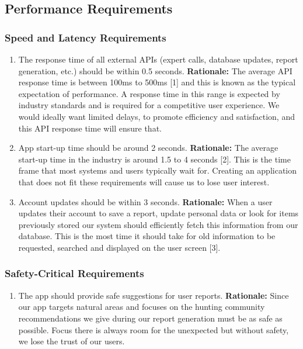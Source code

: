 \documentclass[]{article}
\begin{document}
\subsection{Performance Requirements}
\label{sub:performance_requirements}

\subsubsection{Speed and Latency Requirements}
\label{ssub:speed_and_latency_requirements}
\begin{enumerate}[{PR-SL}1. ]
	\item The response time of all external APIs (expert calls, database updates, report generation, etc.) should be within 0.5 seconds.
	\newline  \textbf{Rationale:} The average API response time is between 100ms to 500ms [1] and this is known as the typical expectation of performance. A response time in this range is expected by industry standards and is required for a competitive user experience. We would ideally want limited delays, to promote efficiency and satisfaction, and this API response time will ensure that. 
	\item App start-up time should be around 2 seconds.
	\newline  \textbf{Rationale:} The average start-up time in the industry is around 1.5 to 4 seconds [2]. This is the time frame that most systems and users typically wait for. Creating an application that does not fit these requirements will cause us to lose user interest. 
	\item Account updates should be within 3 seconds.
	\newline \textbf{Rationale:} When a user updates their account to save a report, update personal data or look for items previously stored our system should efficiently fetch this information from our database. This is the most time it should take for old information to be requested, searched and displayed on the user screen [3].
\end{enumerate}

\subsubsection{Safety-Critical Requirements}
\label{ssub:safety_critical_requirements}
\begin{enumerate}[{PR-SC}1. ]
	\item The app should provide safe suggestions for user reports.
	\newline \textbf{Rationale:} Since our app targets natural areas and focuses on the hunting community recommendations we give during our report generation must be as safe as possible. Focus there is always room for the unexpected but without safety, we lose the trust of our users.
\end{enumerate}
\end{document}
